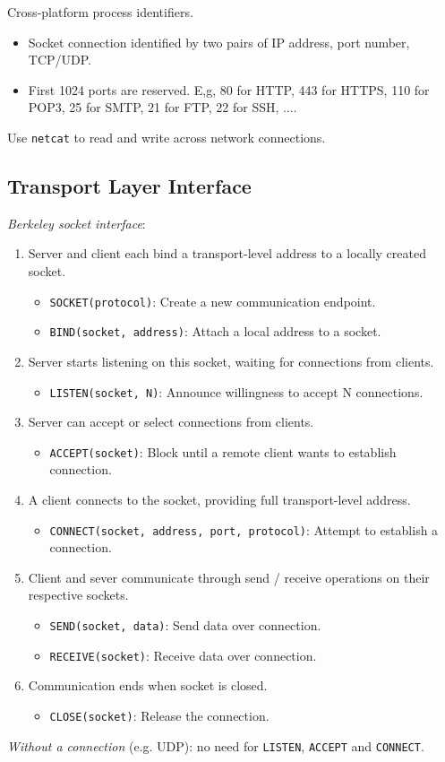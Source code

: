 \documentclass[twocolumn,english]{article}
\begin{document}
Cross-platform process identifiers.
\begin{itemize}
\item Socket connection identified by two pairs of IP address, port number,
TCP/UDP.
\item First 1024 ports are reserved. E,g, 80 for HTTP, 443 for HTTPS, 110
for POP3, 25 for SMTP, 21 for FTP, 22 for SSH, ....
\end{itemize}
Use \texttt{netcat} to read and write across network connections.

\subsection{Transport Layer Interface}

\emph{Berkeley socket interface}:
\begin{enumerate}
\item Server and client each bind a transport-level address to a locally
created socket.
\begin{itemize}
\item \texttt{SOCKET(protocol)}: Create a new communication endpoint.
\item \texttt{BIND(socket, address)}: Attach a local address to a socket.
\end{itemize}
\item Server starts listening on this socket, waiting for connections from
clients.
\begin{itemize}
\item \texttt{LISTEN(socket, N)}: Announce willingness to accept N connections.
\end{itemize}
\item Server can accept or select connections from clients.
\begin{itemize}
\item \texttt{ACCEPT(socket)}: Block until a remote client wants to establish
connection.
\end{itemize}
\item A client connects to the socket, providing full transport-level address.
\begin{itemize}
\item \texttt{CONNECT(socket, address, port, protocol)}: Attempt to establish
a connection.
\end{itemize}
\item Client and sever communicate through send / receive operations on
their respective sockets.
\begin{itemize}
\item \texttt{SEND(socket, data)}: Send data over connection.
\item \texttt{RECEIVE(socket)}: Receive data over connection.
\end{itemize}
\item Communication ends when socket is closed.
\begin{itemize}
\item \texttt{CLOSE(socket)}: Release the connection.
\end{itemize}
\end{enumerate}
\emph{Without a connection} (e.g. UDP): no need for \texttt{LISTEN},
\texttt{ACCEPT} and \texttt{CONNECT}.
\end{document}
